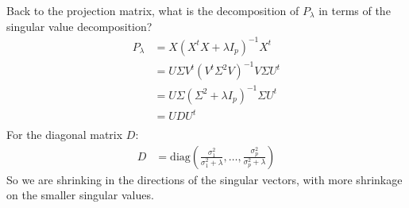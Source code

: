 \begin{frame}[fragile] \frametitle{}

Back to the projection matrix, what is the decomposition of
$P_\lambda$ in terms of the singular value decomposition? \pause
\begin{align*}
P_\lambda &= X (X^t X + \lambda I_p)^{-1} X^t \\
&= U \Sigma V^t (V^t \Sigma^2 V)^{-1} V \Sigma U^t \\
&= U \Sigma (\Sigma^{2} + \lambda I_p)^{-1} \Sigma U^t \\
&= U D U^t \\
\end{align*}
For the diagonal matrix $D$:
\begin{align}
D &= \text{diag} \left( \frac{\sigma_1^2}{\sigma_1^2 + \lambda}, \ldots, \frac{\sigma_p^2}{\sigma_p^2 + \lambda}  \right)
\end{align}
\pause So we are shrinking in the directions of the singular vectors,
with more shrinkage on the smaller singular values.

\end{frame}















